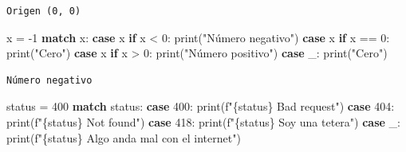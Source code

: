 \documentclass[
  spanish,
  letterpaper,
]{scrbook}
\newenvironment{Shaded}{\begin{snugshade}}{\end{snugshade}}
\newcommand{\BuiltInTok}[1]{\textcolor[rgb]{0.00,0.23,0.31}{#1}}
\newcommand{\ControlFlowTok}[1]{\textcolor[rgb]{0.00,0.23,0.31}{\textbf{#1}}}
\newcommand{\DecValTok}[1]{\textcolor[rgb]{0.68,0.00,0.00}{#1}}
\newcommand{\NormalTok}[1]{\textcolor[rgb]{0.00,0.23,0.31}{#1}}
\newcommand{\OperatorTok}[1]{\textcolor[rgb]{0.37,0.37,0.37}{#1}}
\newcommand{\SpecialCharTok}[1]{\textcolor[rgb]{0.37,0.37,0.37}{#1}}
\newcommand{\SpecialStringTok}[1]{\textcolor[rgb]{0.13,0.47,0.30}{#1}}
\newcommand{\StringTok}[1]{\textcolor[rgb]{0.13,0.47,0.30}{#1}}
\theoremstyle{definition}
\theoremstyle{remark}
\begin{document}
\begin{verbatim}
Origen (0, 0)
\end{verbatim}

\begin{Shaded}
\begin{Highlighting}[]
\NormalTok{x }\OperatorTok{=} \OperatorTok{{-}}\DecValTok{1}
\ControlFlowTok{match}\NormalTok{ x:}
    \ControlFlowTok{case}\NormalTok{ x }\ControlFlowTok{if}\NormalTok{ x }\OperatorTok{\textless{}} \DecValTok{0}\NormalTok{:}
        \BuiltInTok{print}\NormalTok{(}\StringTok{"Número negativo"}\NormalTok{)}
    \ControlFlowTok{case}\NormalTok{ x }\ControlFlowTok{if}\NormalTok{ x }\OperatorTok{==} \DecValTok{0}\NormalTok{:}
        \BuiltInTok{print}\NormalTok{(}\StringTok{"Cero"}\NormalTok{)}
    \ControlFlowTok{case}\NormalTok{ x }\ControlFlowTok{if}\NormalTok{ x }\OperatorTok{\textgreater{}} \DecValTok{0}\NormalTok{:}
        \BuiltInTok{print}\NormalTok{(}\StringTok{"Número positivo"}\NormalTok{)}
    \ControlFlowTok{case}\NormalTok{ \_:}
        \BuiltInTok{print}\NormalTok{(}\StringTok{"Cero"}\NormalTok{)}
\end{Highlighting}
\end{Shaded}

\begin{verbatim}
Número negativo
\end{verbatim}

\begin{Shaded}
\begin{Highlighting}[]
\NormalTok{status }\OperatorTok{=} \DecValTok{400}
\ControlFlowTok{match}\NormalTok{ status:}
    \ControlFlowTok{case} \DecValTok{400}\NormalTok{:}
        \BuiltInTok{print}\NormalTok{(}\SpecialStringTok{f"}\SpecialCharTok{\{}\NormalTok{status}\SpecialCharTok{\}}\SpecialStringTok{ Bad request"}\NormalTok{)}
    \ControlFlowTok{case} \DecValTok{404}\NormalTok{:}
        \BuiltInTok{print}\NormalTok{(}\SpecialStringTok{f"}\SpecialCharTok{\{}\NormalTok{status}\SpecialCharTok{\}}\SpecialStringTok{ Not found"}\NormalTok{)}
    \ControlFlowTok{case} \DecValTok{418}\NormalTok{:}
        \BuiltInTok{print}\NormalTok{(}\SpecialStringTok{f"}\SpecialCharTok{\{}\NormalTok{status}\SpecialCharTok{\}}\SpecialStringTok{ Soy una tetera"}\NormalTok{)}
    \ControlFlowTok{case}\NormalTok{ \_:}
        \BuiltInTok{print}\NormalTok{(}\SpecialStringTok{f"}\SpecialCharTok{\{}\NormalTok{status}\SpecialCharTok{\}}\SpecialStringTok{ Algo anda mal con el internet"}\NormalTok{)}
\end{Highlighting}
\end{Shaded}
\end{document}
